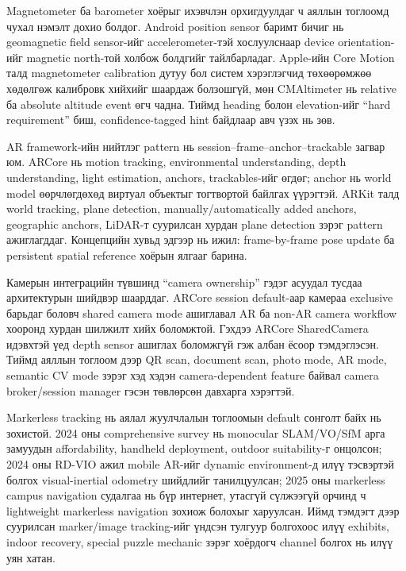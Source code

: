 \begin{sloppy}
Magnetometer ба barometer хоёрыг ихэвчлэн орхигдуулдаг ч аяллын тоглоомд чухал нэмэлт дохио болдог. Android position sensor баримт бичиг нь geomagnetic field sensor-ийг accelerometer-тэй хослуулснаар device orientation-ийг magnetic north-той холбож болдгийг тайлбарладаг. Apple-ийн Core Motion талд magnetometer calibration дутуу бол систем хэрэглэгчид төхөөрөмжөө хөдөлгөж калибровк хийхийг шаардаж болзошгүй, мөн CMAltimeter нь relative ба absolute altitude event өгч чадна. Тиймд heading болон elevation-ийг ``hard requirement'' биш, confidence-tagged hint байдлаар авч үзэх нь зөв.

AR framework-ийн нийтлэг pattern нь session--frame--anchor--trackable загвар юм. ARCore нь motion tracking, environmental understanding, depth understanding, light estimation, anchors, trackables-ийг өгдөг; anchor нь world model өөрчлөгдөхөд виртуал объектыг тогтвортой байлгах үүрэгтэй. ARKit талд world tracking, plane detection, manually/automatically added anchors, geographic anchors, LiDAR-т суурилсан хурдан plane detection зэрэг pattern ажиглагддаг. Концепцийн хувьд эдгээр нь ижил: frame-by-frame pose update ба persistent spatial reference хоёрын ялгааг барина.

Камерын интеграцийн түвшинд ``camera ownership'' гэдэг асуудал тусдаа архитектурын шийдвэр шаарддаг. ARCore session default-аар камераа exclusive барьдаг боловч shared camera mode ашиглавал AR ба non-AR camera workflow хооронд хурдан шилжилт хийх боломжтой. Гэхдээ ARCore SharedCamera идэвхтэй үед depth sensor ашиглах боломжгүй гэж албан ёсоор тэмдэглэсэн. Тиймд аяллын тоглоом дээр QR scan, document scan, photo mode, AR mode, semantic CV mode зэрэг хэд хэдэн camera-dependent feature байвал camera broker/session manager гэсэн төвлөрсөн давхарга хэрэгтэй.

Markerless tracking нь аялал жуулчлалын тоглоомын default сонголт байх нь зохистой. 2024 оны comprehensive survey нь monocular SLAM/VO/SfM арга замуудын affordability, handheld deployment, outdoor suitability-г онцолсон; 2024 оны RD-VIO ажил mobile AR-ийг dynamic environment-д илүү тэсвэртэй болгох visual-inertial odometry шийдлийг танилцуулсан; 2025 оны markerless campus navigation судалгаа нь бүр интернет, утасгүй сүлжээгүй орчинд ч lightweight markerless navigation зохиож болохыг харуулсан. Иймд тэмдэгт дээр суурилсан marker/image tracking-ийг үндсэн тулгуур болгохоос илүү exhibits, indoor recovery, special puzzle mechanic зэрэг хоёрдогч channel болгох нь илүү уян хатан.


\end{sloppy}
